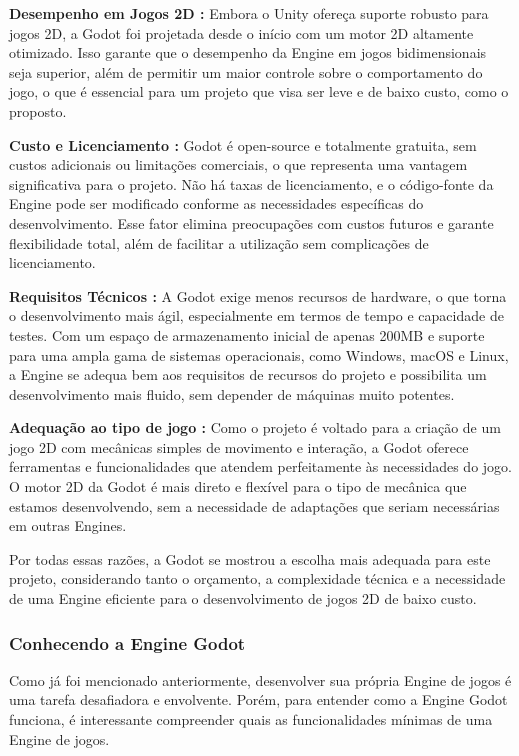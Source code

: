 \textbf{Desempenho em Jogos 2D :}
Embora o Unity ofereça suporte robusto para jogos 2D, a Godot foi projetada desde o início com um motor 2D altamente otimizado. Isso garante que o desempenho da Engine em jogos bidimensionais seja superior, além de permitir um maior controle sobre o comportamento do jogo, o que é essencial para um projeto que visa ser leve e de baixo custo, como o proposto.

\textbf{Custo e Licenciamento :}
Godot é open-source e totalmente gratuita, sem custos adicionais ou limitações comerciais, o que representa uma vantagem significativa para o projeto. Não há taxas de licenciamento, e o código-fonte da Engine pode ser modificado conforme as necessidades específicas do desenvolvimento. Esse fator elimina preocupações com custos futuros e garante flexibilidade total, além de facilitar a utilização sem complicações de licenciamento.

\textbf{Requisitos Técnicos :}
A Godot exige menos recursos de hardware, o que torna o desenvolvimento mais ágil, especialmente em termos de tempo e capacidade de testes. Com um espaço de armazenamento inicial de apenas 200MB e suporte para uma ampla gama de sistemas operacionais, como Windows, macOS e Linux, a Engine se adequa bem aos requisitos de recursos do projeto e possibilita um desenvolvimento mais fluido, sem depender de máquinas muito potentes.

\textbf{Adequação ao tipo de jogo :}
Como o projeto é voltado para a criação de um jogo 2D com mecânicas simples de movimento e interação, a Godot oferece ferramentas e funcionalidades que atendem perfeitamente às necessidades do jogo. O motor 2D da Godot é mais direto e flexível para o tipo de mecânica que estamos desenvolvendo, sem a necessidade de adaptações que seriam necessárias em outras Engines.

Por todas essas razões, a Godot se mostrou a escolha mais adequada para este projeto, considerando tanto o orçamento, a complexidade técnica e a necessidade de uma Engine eficiente para o desenvolvimento de jogos 2D de baixo custo.


\subsubsection{Conhecendo a Engine Godot}

Como já foi mencionado anteriormente, desenvolver sua própria Engine de jogos é uma tarefa desafiadora e envolvente. Porém, para entender como a Engine Godot funciona, é interessante compreender quais as funcionalidades mínimas de uma Engine de jogos.

